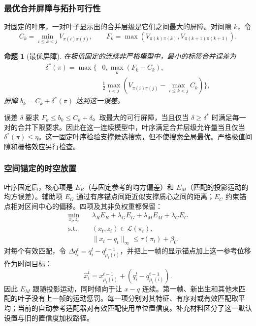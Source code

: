 \documentclass[fontset=none,zihao=5,a4paper]{ctexart}
\newtheorem{proposition}{命题}
\begin{document}
\subsubsection{最优合并屏障与拓扑可行性}
对固定的叶序，一对叶子显示出的合并层级是它们之间最大的屏障。对间隙 $k$，令
\[
 C_k=\min_{i\le k<j}V_{\pi(i)\pi(j)},\qquad F_k=\max(V_{\pi(k)\pi(k)},V_{\pi(k+1)\pi(k+1)}).
\]
\begin{proposition}[最优屏障]\label{prop:barriers}
在极值固定的连续非严格模型中，最小的标签合并误差为
\begin{equation}\label{eq:delta}
\begin{split}
 \delta^*(\pi)=\max\bigg\{&0,\max_k(F_k-C_k),\\
 &\frac12\max_{i<j}\left(V_{\pi(i)\pi(j)}-
                         \max_{i\le k<j}C_k\right)\bigg\},
\end{split}
\end{equation}
屏障 $b_k=C_k+\delta^*(\pi)$ 达到这一误差。
\end{proposition}
误差 $\delta$ 要求 $F_k\le b_k\le C_k+\delta$。取最大的可行屏障，当且仅当 $\delta\ge\delta^*$ 时满足每一对的合并下限要求。因此在这一连续模型中，叶序满足合并层级允许量当且仅当 $\delta^*(\pi)\le\eta$。这一固定叶序检验支撑候选搜索，但不使搜索全局最优。严格极值间隙和栅格效应另行检查。

\subsubsection{空间锚定的时空放置}
叶序固定后，核心项是 $E_R$（与固定参考的均方偏差）和 $E_M$（匹配的投影运动的均方误差）。辅助项 $E_G$ 通过有序锚点间距近似支撑质心之间的距离；$E_C$ 约束锚点相对区间中心的偏移。四项及其非负权重都保留：
\begin{equation}\label{eq:qp}
\begin{aligned}
 \min_{x_t,z_t}\quad&\lambda_R E_R+\lambda_G E_G+\lambda_M E_M+\lambda_C E_C\\
 \mathrm{s.t.}\quad&(x_t,z_t)\in\mathcal{L}(\pi_t),\\
 &\|x_t-q_t\|_\infty\le\tau(\pi_t)+\beta_0.
\end{aligned}
\end{equation}
对每个有效匹配，令 $\Delta q_i^t=q_i^t-q_{\mu_t(i)}^{t-1}$，并把上一帧的显示锚点加上这一参考位移作为时间目标：
\begin{equation}\label{eq:temporal_target}
 \hat x_i^t=x_{\mu_t(i)}^{t-1}+(q_i^t-q_{\mu_t(i)}^{t-1}).
\end{equation}
因此 $E_M$ 跟随投影运动，同时倾向于让 $x-q$ 连续。第一帧、新出生和其他未匹配的叶子没有上一帧的运动惩罚。每一项分别对其特征、有序对或有效匹配取平均；当前的自动参考适配器对有效匹配使用单位置信度。补充材料区分了这一默认设置与旧的置信度加权路径。
\end{document}
